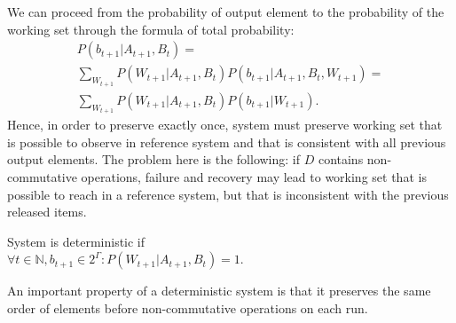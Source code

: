 We can proceed from the probability of output element to the probability of the working set through the formula of total probability:
$$
\begin{array}{lcl}
P(b_{t+1}|A_{t+1},B_t)= \\	
\sum\limits_{W_{t+1}}P(W_{t+1}|A_{t+1},B_t)P(b_{t+1}|A_{t+1},B_t,W_{t+1})=\\	
\sum\limits_{W_{t+1}}P(W_{t+1}|A_{t+1},B_t)P(b_{t+1}|W_{t+1}).	
\end{array}
$$
Hence, in order to preserve exactly once, system must preserve working set that is possible to observe in reference system and that is consistent with all previous output elements. The problem here is the following: if $D$ contains non-commutative operations, failure and recovery may lead to working set that is possible to reach in a reference system, but that is inconsistent with the previous released items. 

\begin{definition}{System is deterministic}
if\\ 
$\forall{t\in{\mathbb{N}}, b_{t+1}\in{2^{\Gamma}}}:P(W_{t+1}|A_{t+1},B_t)=1$.
\end{definition}

An important property of a deterministic system is that it preserves the same order of elements before non-commutative operations on each run.



